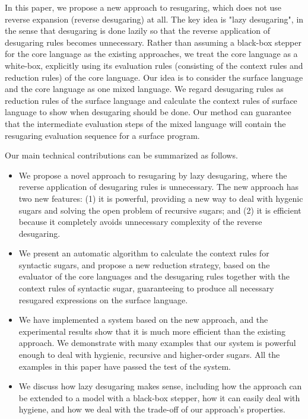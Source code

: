 \label{mark:mention}
In this paper, we propose a new approach to resugaring, which does not use reverse expansion (reverse desugaring) at all.
The key idea is "lazy desugaring", in the sense that desugaring is done lazily  so that the reverse application of desugaring rules becomes unnecessary. Rather than assuming a black-box stepper for the core language as the existing approaches, we treat the core language as a white-box, explicitly using
its evaluation rules (consisting of the context rules and reduction rules) of the core language.
Our idea is to consider the surface language and the core language as one mixed language. We regard desugaring rules as reduction rules of the surface language and calculate the context rules of surface language to show when desugaring
should be done. Our method can guarantee that the intermediate evaluation steps of the mixed language will contain the resugaring evaluation sequence for a surface program.

Our main technical contributions can be summarized as follows.
\begin{itemize}
\item We propose a novel approach to resugaring by lazy desugaring, where the reverse application of desugaring rules is unnecessary. The new approach has two new features: (1) it is powerful, providing a new way to deal with hygenic sugars and solving the open problem of recursive sugars; and (2) it is efficient because it completely avoids unnecessary complexity of the reverse desugaring.

\item We present an automatic algorithm to calculate the context rules for syntactic sugars, and propose a new reduction strategy, based on the evaluator of the core languages and the desugaring rules together with the context rules of syntactic sugar, guaranteeing to produce all necessary resugared expressions on the surface language.

\item We have implemented a system based on the new approach, and the experimental results show that it is much more efficient than the existing approach. We demonstrate with many examples that our system is powerful enough to deal with hygienic, recursive and higher-order sugars. All the examples in this paper have passed the test of the system.

\item We discuss how lazy desugaring makes sense, including how the approach can be extended to a model with a black-box stepper, how it can easily deal with hygiene, and how we deal with the trade-off of our approach's properties.

\end{itemize}

